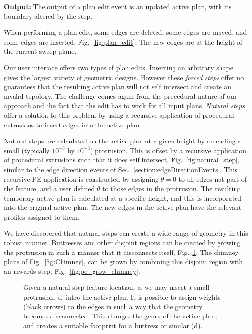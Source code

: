 {\bf Output:} The output of a plan edit event is an updated active plan, with its boundary altered by the step.

When performing a plan edit, some edges are deleted, some edges are moved, and some edges are inserted, Fig.~\ref{fig:plan_edit}. The new edges are at the height of the current sweep plane.

Our user interface offers two types of plan edits. Inserting an arbitrary shape gives the largest variety of geometric designs. However these \emph{forced steps} offer no guarantees that the resulting active plan will not self intersect and create an invalid topology. The challenge comes again from the procedural nature of our approach and the fact that the edit has to work for all input plans. \emph{Natural steps} offer a solution to this problem by using a recursive application of procedural extrusions to insert edges into the active plan.

Natural steps are calculated on the active plan at a given height by amending a small (typically $10^{-3}$ by $10^{-3}$) protrusion. This is offset by a recursive application of procedural extrusions such that it does self intersect, Fig.~\ref{fig:natural_step}, similar to the edge direction events of Sec.~\ref{section:edgeDirecitonEvents}. This recursive PE application is constructed by assigning $\theta = 0$ to all edges not part of the feature, and a user defined $\theta$ to those edges in the protrusion. The resulting temporary active plan is calculated at a specific height, and this is incorporated into the original active plan. The new edges in the active plan have the relevant profiles assigned to them.

We have discovered that natural steps can create a wide range of geometry in this robust manner. Buttresses and other disjoint regions can be created by growing the protrusion in such a manner that it disconnects itself, Fig.~\ref{fig:pe_grow_butress}. The chimney plans of Fig.~\ref{fig:Chimney}, can be grown by combining this disjoint region with an inwards step, Fig.~\ref{fig:pe_grow_chimney}.

\begin{figure}
  \centering
  \def\svgwidth{1.0\columnwidth}
  
  \caption[Using the natural step for genus change]{\label{fig:pe_grow_butress}Given a natural step feature location, a, we may insert a small protrusion, d, intro the active plan. It is possible to assign weights (black arrows) to the edges in such a way that the geometry becomes disconnected. This changes the genus of the active plan, and creates a suitable footprint for a buttress or similar (d).}
\end{figure}

